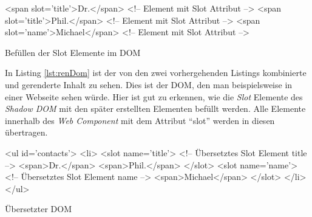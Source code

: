 \documentclass[12pt, paper=a4, bibtotoc, toc=listof, headsepline=true]{scrreprt}
\begin{document}
			\begin{listing}
				\begin{HTMLcode*}{}
<span slot='title'>Dr.</span> <!-- Element mit Slot Attribut -->
<span slot='title'>Phil.</span> <!-- Element mit Slot Attribut -->
<span slot='name'>Michael</span> <!-- Element mit Slot Attribut -->
				\end{HTMLcode*}
				\caption{Befüllen der Slot Elemente im DOM}
				\label{lst:sloNutLigDom}
			\end{listing}
			In Listing \ref{lst:renDom} ist der von den zwei vorhergehenden Listings kombinierte und gerenderte Inhalt zu sehen. Dies ist der \ac{DOM}, den man beispielsweise in einer Webseite sehen würde. Hier ist gut zu erkennen, wie die \emph{Slot} Elemente des \emph{Shadow \ac{DOM}} mit den später erstellten Elementen befüllt werden. Alle Elemente innerhalb des \emph{Web Component} mit dem Attribut \enquote{slot} werden in diesen übertragen.
			\begin{listing}
				\begin{HTMLcode*}{}
<ul id='contacts'>
   <li>
      <slot name='title'> <!-- Übersetztes Slot Element title -->
	     <span>Dr.</span>
	     <span>Phil.</span>
	  </slot>
      <slot name='name'> <!-- Übersetztes Slot Element name -->
	     <span>Michael</span>
      </slot>
   </li>
</ul>
				\end{HTMLcode*}
				\caption{Übersetzter DOM}
				\label{lst:renDom}
			\end{listing}
\end{document}
